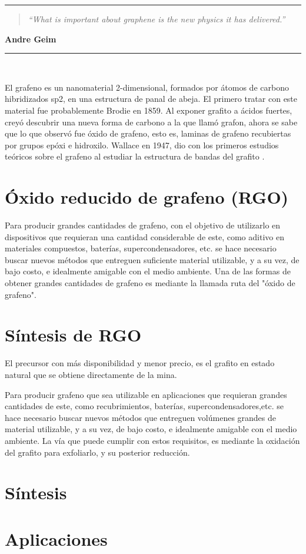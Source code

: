 \noindent
\rule{\linewidth}{1 pt}
\begin{flushright}
	\begin{quotation}
		\small{
			\textit{``What is important about graphene is the new physics it has delivered.''}}
	\end{quotation}
	\bf{Andre Geim}
\end{flushright}
\noindent
\rule{\linewidth}{1 pt}\\
\vfill

El grafeno es un nanomaterial 2-dimensional, formados por átomos de carbono  hibridizados sp2, en una estructura de panal de abeja. El primero tratar con este material fue probablemente Brodie en 1859. Al exponer grafito a ácidos fuertes, creyó descubrir una nueva forma de carbono a la que llamó grafon, ahora se sabe que lo que observó fue óxido de grafeno, esto es, laminas de grafeno recubiertas por grupos epóxi e hidroxilo\cite{Geim2012}. Wallace en 1947, dio con los primeros estudios teóricos sobre el grafeno al estudiar la estructura de bandas del grafito \cite{Wallace1947}.

\section{Óxido reducido de grafeno (RGO)}
Para producir grandes cantidades de grafeno, con el objetivo de utilizarlo en dispositivos que requieran una cantidad considerable de este, como aditivo en materiales compuestos, baterías, supercondensadores, etc. se hace necesario buscar nuevos métodos que entreguen suficiente material utilizable, y a su vez, de bajo costo, e idealmente amigable con el medio ambiente.
Una de las formas de obtener grandes cantidades de grafeno es mediante la llamada ruta del "óxido de grafeno".

\section{Síntesis de RGO}
El precursor con más disponibilidad y menor precio, es el grafito en estado natural que se obtiene directamente de la mina.

Para producir grafeno que sea utilizable en aplicaciones que requieran grandes cantidades de este, como recubrimientos, baterías, supercondensadores,etc. se hace necesario buscar nuevos métodos que entreguen volúmenes grandes de material utilizable, y a su vez, de bajo costo, e idealmente amigable con el medio ambiente. La vía que puede cumplir con estos requisitos, es mediante la oxidación del grafito para exfoliarlo, y su posterior reducción.

\section{Síntesis}


\section{Aplicaciones}